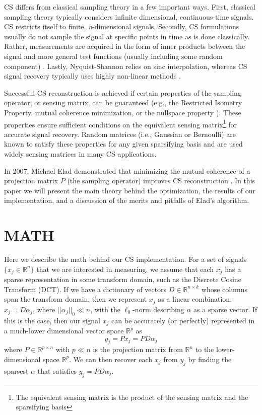 \documentclass[journal]{IEEEtran}
\begin{document}
CS differs from classical sampling theory in a few important ways.  First, classical sampling theory typically considers infinite dimensional, continuous-time signals.  CS restricts itself to finite, \emph{n}-dimensional signals.  Secondly, CS formulations usually do not sample the signal at specific points in time as is done classically.  Rather, measurements are acquired in the form of inner products between the signal and more general test functions (usually including some random component) \cite{csbook}.  Lastly, Nyquist-Shannon relies on sinc interpolation, whereas CS signal recovery typically uses highly non-linear methods \cite{oppenheimdigital,csbook}.

Successful CS reconstruction is achieved if certain properties of the sampling operator, or sensing matrix, can be guaranteed (e.g., the Restricted Isometry Property, mutual coherence minimization, or the nullspace property \cite{tcs}).  These properties ensure sufficient conditions on the equivalent sensing matrix\footnote{The equivalent sensing matrix is the product of the sensing matrix and the sparsifying basis} for accurate signal recovery. Random matrices (i.e., Gaussian or Bernoulli) are known to satisfy these properties for any given sparsifying basis and are used widely sensing matrices in many CS applications.

In 2007, Michael Elad demonstrated that minimizing the mutual coherence of a projection matrix $P$ (the sampling operator) improves CS reconstruction \cite{elad}.  In this paper we will present the main theory behind the optimization, the results of our implementation, and a discussion of the merits and pitfalls of Elad's algorithm.

\section{MATH}

Here we describe the math behind our CS implementation.  For a set of signals $\{x_j \in \mathbb{R}^n\}$ that we are interested in measuring, we assume that each $x_j$ has a sparse representation in some transform domain, such as the Discrete Cosine Transform (DCT).  If we have a dictionary of vectors $D \in \mathbb{R}^{n\times k}$ whose columns span the transform domain, then we represent $x_j$ as a linear combination: $x_j = D\alpha_j$, where $||\alpha_j||_0 \ll n$, with the $\ell_0$-norm describing $\alpha$ as a sparse vector.  If this is the case, then our signal $x_j$ can be accurately (or perfectly) represented in a much-lower dimensional vector space $\mathbb{R}^p$ as $$y_j = Px_j=PD\alpha_j$$ where $P \in \mathbb{R}^{p\times n}$ with $p \ll n$ is the projection matrix from $\mathbb{R}^n$ to the lower-dimensional space $\mathbb{R}^p$.  We can then recover each $x_j$ from $y_j$ by finding the sparsest $\alpha$ that satisfies $y_j = PD\alpha_j$.
\end{document}
